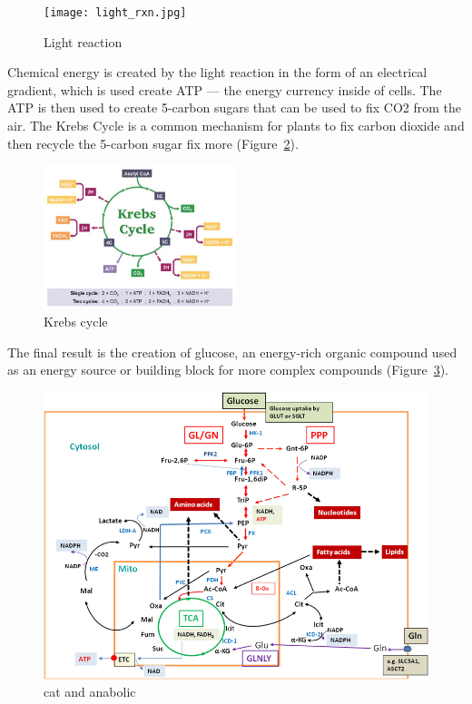 \begin{figure}[htb]
	\centering
\texttt{[image: light\_rxn.jpg]}
	\caption{Light reaction}
	\label{fig:light_rxn}
\end{figure}

Chemical energy is created by the light reaction in the form of an electrical gradient, which is used create ATP --- the energy currency inside of cells. The ATP is then used to create 5-carbon sugars that can be used to fix CO2 from the air. The Krebs Cycle is a common mechanism for plants to fix carbon dioxide and then recycle the 5-carbon sugar fix more \CO (Figure~\ref{fig:krebs-cycle_med}). 

\begin{figure}[htb]
	\centering
\includegraphics[width=0.50\textwidth]{graphics/krebs-cycle_med.jpeg}
	\caption{Krebs cycle}
	\label{fig:krebs-cycle_med}
\end{figure}


The final result is the creation of glucose, an energy-rich organic compound used as an energy source or building block for more complex compounds (Figure~\ref{fig:Major-catabolic-and-anabolic-pathways-in-mammalian}). 
  
\begin{figure}
	\centering
\includegraphics[width=.5\textwidth]{graphics/Major-catabolic-and-anabolic-pathways-in-mammalian.png}
	\caption{cat and anabolic}
	\label{fig:Major-catabolic-and-anabolic-pathways-in-mammalian}
\end{figure}


